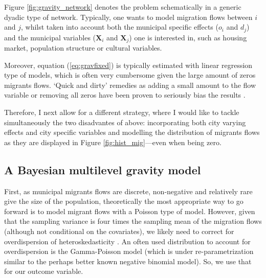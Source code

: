 \documentclass[fleqn,10pt]{SelfArx} %
\begin{document}
        Figure \ref{fig:gravity_network} denotes the problem schematically in a
        generic dyadic type of network. Typically, one wants to model migration
        flows between $i$ and $j$, whilst taken into account both the municipal
        specific effects ($o_i$ and $d_j$) and the municipal variables
        ($\mathbf{X}_i$ and $\mathbf{X}_j$) one is interested in, such as
        housing market, population structure or cultural variables.
                  
        Moreover, equation (\ref{eq:gravfixed}) is typically estimated with
        linear regression type of models, which is often very cumbersome given
        the large amount of zeros migrants flows. `Quick and dirty' remedies as
        adding a small amount to the flow variable or removing all zeros have
        been proven to seriously bias the results \citep{linders2006estimation,
          burger2009specification}.
        	

        Therefore, I next allow for a different strategy, where I would like to
        tackle simultaneously the two disadvantes of above: incorporating both
        city varying effects and city specific variables and modelling the
        distribution of migrants flows as they are displayed in Figure
        \ref{fig:hist_mig}---even when being zero.

        \subsection{A Bayesian multilevel gravity model}

        First, as municipal migrants flows are discrete, non-negative and
        relatively rare give the size of the population, theoretically the most
        appropriate way to go forward is to model migrant flows with a Poisson
        type of model. However, given that the sampling variance is four times
        the sampling mean of the migration flows (although not conditional on
        the covariates), we likely need to correct for overdispersion of
        heteroskedasticity \citep[][states that heteroskedasticity (rather than
        the presence of too many zeros) is responsible for the main source of
        bias within gravity models.]{silva2006log}. An often used distribution
        to account for overdispersion is the Gamma-Poisson model (which is under
        re-parametrization similar to the perhaps better known negative binomial
        model). So, we use that for our outcome variable.
\end{document}

